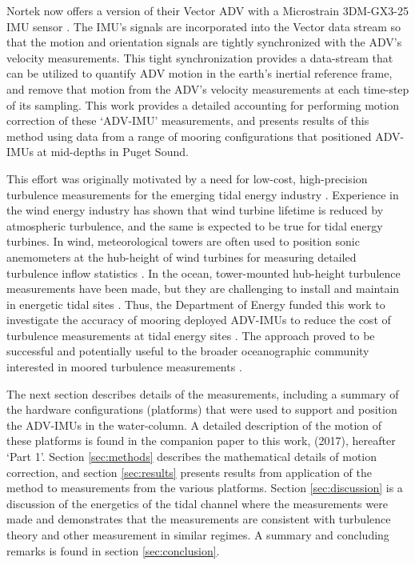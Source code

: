 Nortek now offers a version of their Vector ADV with a Microstrain 3DM-GX3-25 IMU sensor \cite[]{vector_manual2005, MicroStrain2012a}. The IMU's signals are incorporated into the Vector data stream so that the motion and orientation signals are tightly synchronized with the ADV's velocity measurements. This tight synchronization provides a data-stream that can be utilized to quantify ADV motion in the earth's inertial reference frame, and remove that motion from the ADV's velocity measurements at each time-step of its sampling. This work provides a detailed accounting for performing motion correction of these `ADV-IMU' measurements, and presents results of this method using data from a range of mooring configurations that positioned ADV-IMUs at mid-depths in Puget Sound. 

This effort was originally motivated by a need for low-cost, high-precision turbulence measurements for the emerging tidal energy industry \cite[]{Mccaffrey++2015, Alexander+Hamlington2015}. Experience in the wind energy industry has shown that wind turbine lifetime is reduced by atmospheric turbulence, and the same is expected to be true for tidal energy turbines. In wind, meteorological towers are often used to position sonic anemometers at the hub-height of wind turbines for measuring detailed turbulence inflow statistics \cite[]{Hand++2003, Kelley++2005, Mucke++2011, Afgan++2013}. In the ocean, tower-mounted hub-height turbulence measurements have been made, but they are challenging to install and maintain in energetic tidal sites \cite[]{Gunawan++2014}. Thus, the Department of Energy funded this work to investigate the accuracy of mooring deployed ADV-IMUs to reduce the cost of turbulence measurements at tidal energy sites \cite[]{Kilcher++2016}. The approach proved to be successful and potentially useful to the broader oceanographic community interested in moored turbulence measurements \cite[]{Lueck+Huang1999, Doherty++1999, Nash++2004, Moum+Nash2009b, Alford2010, Paskyabi+Fer2013}.

The next section describes details of the measurements, including a summary of the hardware configurations (platforms) that were used to support and position the ADV-IMUs in the water-column. A detailed description of the motion of these platforms is found in the companion paper to this work, \citeauthor{Harding++2017} (2017), hereafter `Part 1'. Section \ref{sec:methods} describes the mathematical details of motion correction, and section \ref{sec:results} presents results from application of the method to measurements from the various platforms. Section \ref{sec:discussion} is a discussion of the energetics of the tidal channel where the measurements were made and demonstrates that the measurements are consistent with turbulence theory and other measurement in similar regimes. A summary and concluding remarks is found in section \ref{sec:conclusion}.

